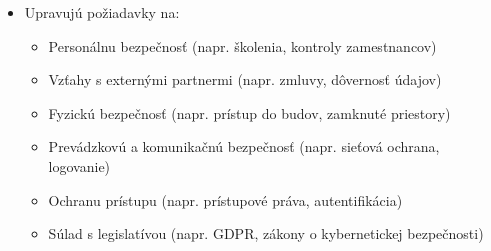 \documentclass[12pt,a4paper]{article}
\begin{document}
{\begin{itemize}
\begin{itemize}
            \item Upravujú požiadavky na:
            \begin{itemize}
                \item Personálnu bezpečnosť (napr. školenia, kontroly zamestnancov)
                \item Vzťahy s externými partnermi (napr. zmluvy, dôvernosť údajov)
                \item Fyzickú bezpečnosť (napr. prístup do budov, zamknuté priestory)
                \item Prevádzkovú a komunikačnú bezpečnosť (napr. sieťová ochrana, logovanie)
                \item Ochranu prístupu (napr. prístupové práva, autentifikácia)
                \item Súlad s legislatívou (napr. GDPR, zákony o kybernetickej bezpečnosti)
            \end{itemize}
        \end{itemize}
    \end{itemize}
}
\end{document}
